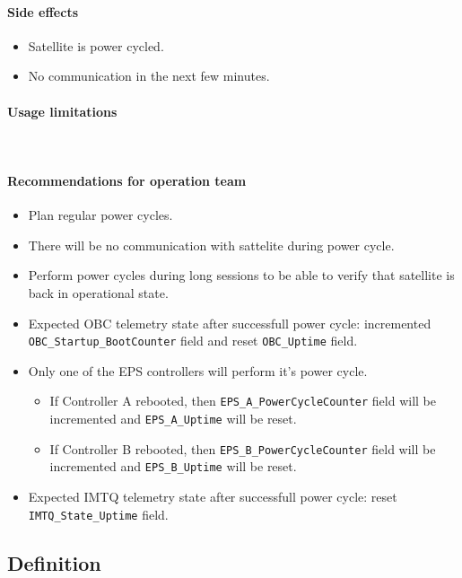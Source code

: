 \paragraph{Side effects}
\begin{itemize}
	\item Satellite is power cycled. 
	\item No communication in the next few minutes.
\end{itemize}

\paragraph{Usage limitations}\mbox{}\\ 
\None

\paragraph{Recommendations for operation team}
\begin{itemize}
	\item Plan regular power cycles.
	\item There will be no communication with sattelite during power cycle.
	\item Perform power cycles during long sessions to be able to verify that satellite is back in operational state.
	\item Expected OBC telemetry state after successfull power cycle: incremented \texttt{OBC_Startup_BootCounter} field and reset \texttt{OBC_Uptime} field. 
	\item Only one of the EPS controllers will perform it's power cycle. 
		\begin{itemize} 
			\item If Controller A rebooted, then \texttt{EPS_A_PowerCycleCounter} field will be incremented and \texttt{EPS_A_Uptime} will be reset.
			\item If Controller B rebooted, then \texttt{EPS_B_PowerCycleCounter} field will be incremented and \texttt{EPS_B_Uptime} will be reset.
		\end{itemize}	
	\item Expected IMTQ telemetry state after successfull power cycle: reset \texttt{IMTQ_State_Uptime} field.	
\end{itemize}


\subsection{Definition}

